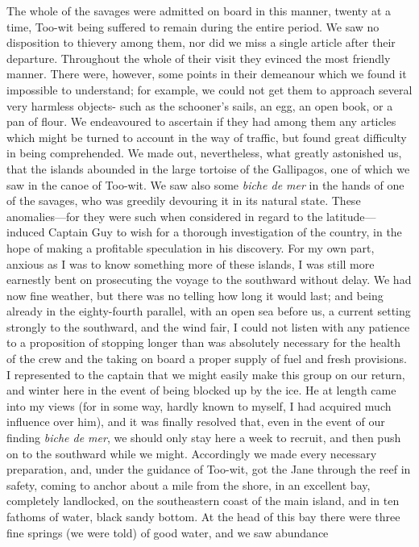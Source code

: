 The whole of the savages were admitted on board in this manner, twenty at a
time, Too-wit being suffered to remain during the entire period. We saw no
disposition to thievery among them, nor did we miss a single article after their
departure. Throughout the whole of their visit they evinced the most friendly
manner. There were, however, some points in their demeanour which we found it
impossible to understand; for example, we could not get them to approach several
very harmless objects- such as the schooner's sails, an egg, an open book, or a
pan of flour. We endeavoured to ascertain if they had among them any articles
which might be turned to account in the way of traffic, but found great
difficulty in being comprehended. We made out, nevertheless, what greatly
astonished us, that the islands abounded in the large tortoise of the
Gallipagos, one of which we saw in the canoe of Too-wit. We saw also some
\emph{biche de mer} in the hands of one of the savages, who was greedily
devouring it in its natural state. These anomalies---for they were such when
considered in regard to the latitude---induced Captain Guy to wish for a
thorough investigation of the country, in the hope of making a profitable
speculation in his discovery. For my own part, anxious as I was to know
something more of these islands, I was still more earnestly bent on prosecuting
the voyage to the southward without delay. We had now fine weather, but there
was no telling how long it would last; and being already in the eighty-fourth
parallel, with an open sea before us, a current setting strongly to the
southward, and the wind fair, I could not listen with any patience to a
proposition of stopping longer than was absolutely necessary for the health of
the crew and the taking on board a proper supply of fuel and fresh provisions. I
represented to the captain that we might easily make this group on our return,
and winter here in the event of being blocked up by the ice. He at length came
into my views (for in some way, hardly known to myself, I had acquired much
influence over him), and it was finally resolved that, even in the event of our
finding \emph{biche de mer}, we should only stay here a week to recruit, and
then push on to the southward while we might. Accordingly we made every
necessary preparation, and, under the guidance of Too-wit, got the Jane through
the reef in safety, coming to anchor about a mile from the shore, in an
excellent bay, completely landlocked, on the southeastern coast of the main
island, and in ten fathoms of water, black sandy bottom. At the head of this bay
there were three fine springs (we were told) of good water, and we saw abundance
